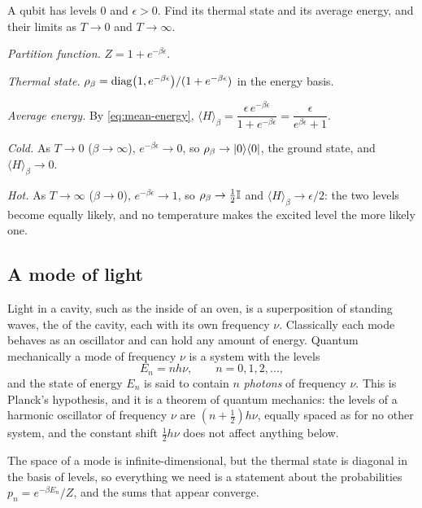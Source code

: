 \begin{example}\label{ex:thermal-qubit}
  A qubit has levels $0$ and $\epsilon>0$. Find its thermal state and its average energy, and their limits as $T\to0$ and $T\to\infty$.
\end{example}
\begin{solution}
  \begin{steps}
    \item \emph{Partition function.} $Z=1+e^{-\beta\epsilon}$.
    \item \emph{Thermal state.} $\rho_\beta=\operatorname{diag}\bigl(1,e^{-\beta\epsilon}\bigr)/(1+e^{-\beta\epsilon})$ in the energy basis.
    \item \emph{Average energy.} By \eqref{eq:mean-energy}, $\langle H\rangle_\beta=\dfrac{\epsilon\,e^{-\beta\epsilon}}{1+e^{-\beta\epsilon}}=\dfrac{\epsilon}{e^{\beta\epsilon}+1}$.
    \item \emph{Cold.} As $T\to0$ ($\beta\to\infty$), $e^{-\beta\epsilon}\to0$, so $\rho_\beta\to\left|0\right\rangle\!\left\langle0\right|$, the ground state, and $\langle H\rangle_\beta\to0$.
    \item \emph{Hot.} As $T\to\infty$ ($\beta\to0$), $e^{-\beta\epsilon}\to1$, so $\rho_\beta\to\tfrac12\mathbb{I}$ and $\langle H\rangle_\beta\to\epsilon/2$: the two levels become equally likely, and no temperature makes the excited level the more likely one.
  \end{steps}
\end{solution}

\subsection{A mode of light}

Light in a cavity, such as the inside of an oven, is a superposition of standing waves, the  of the cavity, each with its own frequency $\nu$. Classically each mode behaves as an oscillator and can hold any amount of energy. Quantum mechanically a mode of frequency $\nu$ is a system with the levels
\[
  E_n=nh\nu,\qquad n=0,1,2,\dots,
\]
and the state of energy $E_n$ is said to contain $n$ \emph{photons} of frequency $\nu$. This is Planck's hypothesis, and it is a theorem of quantum mechanics: the levels of a harmonic oscillator of frequency $\nu$ are $(n+\tfrac12)h\nu$, equally spaced as for no other system, and the constant shift $\tfrac12h\nu$ does not affect anything below.

The space of a mode is infinite-dimensional, but the thermal state is diagonal in the basis of levels, so everything we need is a statement about the probabilities $p_n=e^{-\beta E_n}/Z$, and the sums that appear converge.

